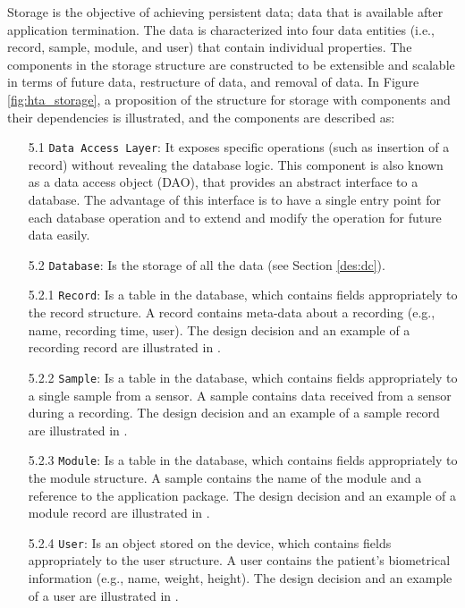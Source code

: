 Storage is the objective of achieving persistent data; data that is available after application termination. The data is characterized into four data entities (i.e., record, sample, module, and user) that contain individual properties.  The components in the storage structure are constructed to be extensible and scalable in terms of future data, restructure of data, and removal of data.  In Figure \ref{fig:hta_storage}, a proposition of the structure for storage with components and their dependencies is illustrated, and the components are described as:

\begin{itemize}
    \item[5.1] \verb|Data Access Layer|: It exposes specific operations (such as insertion of a record) without revealing the database logic. This component is also known as a data access object (DAO), that provides an abstract interface to a database. The advantage of this interface is to have a single entry point for each database operation and to extend and modify the operation for future data easily. 
    \item[5.2] \verb|Database|: Is the storage of all the data (see Section \ref{des:dc}).
    \item[5.2.1] \verb|Record|: Is a table in the database, which contains fields appropriately to the record structure. A record contains meta-data about a recording (e.g., name, recording time, user). The design decision and an example of a recording record are illustrated in .
    \item[5.2.2] \verb|Sample|: Is a table in the database, which contains fields appropriately to a single sample from a sensor. A sample contains data received from a sensor during a recording. The design decision and an example of a sample record are illustrated in .
    \item[5.2.3] \verb|Module|: Is a table in the database, which contains fields appropriately to the module structure. A sample contains the name of the module and a reference to the application package. The design decision and an example of a module record are illustrated in .
    \item[5.2.4] \verb|User|: Is an object stored on the device, which contains fields appropriately to the user structure. A user contains the patient's biometrical information (e.g., name, weight, height). The design decision and an example of a user are illustrated in .
\end{itemize}

